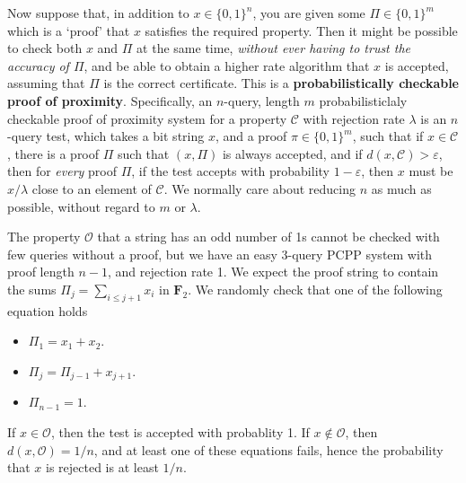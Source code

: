 Now suppose that, in addition to $x \in \{ 0, 1 \}^n$, you are given some $\Pi \in \{ 0, 1 \}^m$ which is a `proof' that $x$ satisfies the required property. Then it might be possible to check both $x$ and $\Pi$ at the same time, {\it without ever having to trust the accuracy of $\Pi$}, and be able to obtain a higher rate algorithm that $x$ is accepted, assuming that $\Pi$ is the correct certificate. This is a {\bf probabilistically checkable proof of proximity}. Specifically, an $n$-query, length $m$ probabilisticlaly checkable proof of proximity system for a property $\mathcal{C}$ with rejection rate $\lambda$ is an $n$-query test, which takes a bit string $x$, and a proof $\pi \in \{ 0, 1 \}^m$, such that if $x \in \mathcal{C}$, there is a proof $\Pi$ such that $(x,\Pi)$ is always accepted, and if $d(x,\mathcal{C}) > \varepsilon$, then for {\it every} proof $\Pi$, if the test accepts with probability $1 - \varepsilon$, then $x$ must be $x/\lambda$ close to an element of $\mathcal{C}$. We normally care about reducing $n$ as much as possible, without regard to $m$ or $\lambda$.

\begin{example}
    The property $\mathcal{O}$ that a string has an odd number of 1s cannot be checked with few queries without a proof, but we have an easy 3-query PCPP system with proof length $n-1$, and rejection rate 1. We expect the proof string to contain the sums $\Pi_j = \sum_{i \leq j+1} x_i$ in $\mathbf{F}_2$. We randomly check that one of the following equation holds
    \begin{itemize}
        \item $\Pi_1 = x_1 + x_2$.
        \item $\Pi_j = \Pi_{j-1} + x_{j+1}$.
        \item $\Pi_{n-1} = 1$.
    \end{itemize}
    If $x \in \mathcal{O}$, then the test is accepted with probablity 1. If $x \not \in \mathcal{O}$, then $d(x,\mathcal{O}) = 1/n$, and at least one of these equations fails, hence the probability that $x$ is rejected is at least $1/n$.
\end{example}

